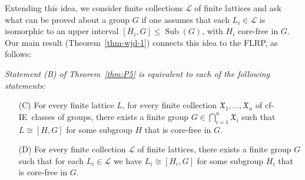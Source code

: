 \documentclass[11pt]{amsart}
\theoremstyle{plain}
\newtheorem{lemma}[theorem]{Lemma}
\theoremstyle{definition}
\theoremstyle{remark}
\numberwithin{theorem}{section}
\numberwithin{claim}{section}
\numberwithin{equation}{section}
\numberwithin{conjecture}{section}
\newcommand{\<}{\ensuremath{\langle}}
\renewcommand{\>}{\ensuremath{\rangle}}
\renewcommand{\leq}{\ensuremath{\leqslant}}
\newcommand{\Sub}{\ensuremath{\operatorname{Sub}}}
\newcommand{\FLRP}{{\small FLRP}}
\newcommand{\0}{\ensuremath{\mathbf{0}}}
\newcommand{\1}{\ensuremath{\mathbf{1}}}
\newcommand{\2}{\ensuremath{\mathbf{2}}}
\newcommand{\3}{\ensuremath{\mathbf{3}}}
\newcommand{\4}{\ensuremath{\mathbf{4}}}
\newcommand{\5}{\ensuremath{\mathbf{5}}}
\newcommand{\sG}{\ensuremath{\mathfrak{X}}}
\newcommand{\sL}{\ensuremath{\mathscr{L}}}
\newcommand{\IE}{{\small IE}}
\begin{document}
Extending this idea, we consider finite collections $\sL$ of finite lattices
and ask what can be proved about a group $G$ if one assumes that each 
$L_i\in \sL$ is isomorphic to an upper interval $[H_i, G]\leq \Sub(G)$, with
$H_i$ core-free in $G$.  Our main result (Theorem~\ref{thm-wjd-1}) connects this idea to
the \FLRP, as follows:\\[6pt]
{\it 
Statement (B) of Theorem~\ref{thm:P5} is equivalent to each of the following statements:
\begin{enumerate}
\item[(C)]
For every finite lattice $L$, for every finite collection $\sG_1, \dots, \sG_n$
of cf-\IE\ classes of groups,
there exists a finite group $G \in \bigcap\limits_{i=1}^n \sG_i$ such that $L \cong
[H,G]$ for some subgroup $H$ that is core-free in $G$. %



\item[(D)]
For every finite collection $\sL$ of finite lattices, there exists a finite
group $G$ such that for each $L_i \in \sL$ we have 
$L_i\cong [H_i, G]$ for some subgroup $H_i$ that is core-free in $G$. %
\end{enumerate}}
\end{document}
